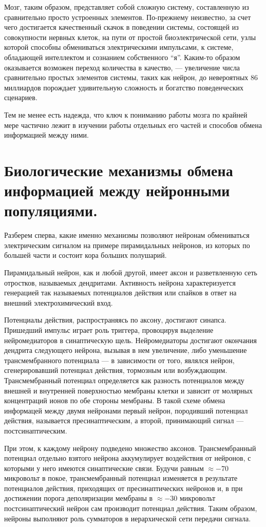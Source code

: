 Мозг, таким образом, представляет собой сложную систему, составленную из сравнительно
просто устроенных элементов.
По-прежнему неизвестно, за счет чего достигается
качественный скачок в поведении системы, состоящей из совокупности
нервных клеток, на пути от простой биоэлектрической сети,
узлы которой способны обмениваться электрическими импульсами, к
системе, обладающей интеллектом и сознанием собственного ``я''.
Каким-то образом оказывается возможен переход количества в качество, --- увеличение
числа сравнительно простых элементов системы,
таких как нейрон, до невероятных 86 миллиардов порождает удивительную
сложность и богатство поведенческих сценариев.

Тем не менее есть надежда, что ключ к пониманию работы мозга по крайней мере
частично лежит в изучении работы отдельных его частей и
способов обмена информацией между ними.

\section{Биологические механизмы обмена информацией между нейронными популяциями.}
Разберем сперва, какие именно механизмы позволяют нейронам обмениваться
электрическим сигналом на примере пирамидальных нейронов, из которых по
большей части и состоит кора больших полушарий.

Пирамидальный нейрон, как и любой другой, имеет аксон и
разветвленную сеть отростков, называемых дендритами.
Активность нейрона характеризуется генерацией так называемых
потенциалов действия или спайков в ответ на внешний электрохимический вход.

Потенциалы действия, распространяясь по аксону, достигают синапса.
Пришедший импульс играет роль триггера, провоцируя выделение
нейромедиаторов в  синаптическую щель. Нейромедиаторы достигают окончания
дендрита следующего нейрона, вызывая в нем увеличение, либо уменьшение
трансмембранного потенциала --- в зависимости от того, являлся
нейрон, сгенерировавший потенциал действия, тормозным или возбуждающим.
Трансмембранный потенциал определяется как разность потенциалов между
внешней и внутренней поверхностью мембраны клетки и зависит от молярных
концентраций ионов по обе стороны мембраны.
В такой схеме обмена информацей между двумя нейронами первый нейрон,
породивший потенциал действия, называется пресинаптическим, а второй,
принимающий сигнал --- постсинаптическим.

При этом, к каждому нейрону подведено множество аксонов.  Трансмембранный
потенциал отдельно взятого нейрона аккумулирует воздействия от нейронов, с
которыми у него имеются синаптические связи. Будучи равным $\approx -70$
микровольт в покое, трансмембранный потенциал изменяется в результате
потенциалов действия, приходящих от пресинаптических нейронов и, в при
достижении порога деполяризации мембраны в $\approx -30$ микровольт
постсинаптический нейрон сам производит потенциал действия.  Таким образом,
нейроны выполняют роль сумматоров в иерархической сети передачи сигнала.

